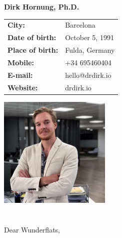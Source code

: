 \documentclass[11pt]{article}
\begin{document}
\Large
\noindent
\textbf{Dirk Hornung, Ph.D.} \\

\normalsize
\noindent
\begin{minipage}{0.5\linewidth}
  \begin{tabularx}{0.6\textwidth}{>{\bfseries}l l}
    City:           & Barcelona \\
    Date of birth:  & October 5, 1991\\
    Place of birth: & Fulda, Germany \\
    Mobile:         & +34 695460404 \\
    E-mail:         & hello@drdirk.io \\
    Website:      	& drdirk.io
  \end{tabularx}
\end{minipage}
\begin{minipage}{0.5\linewidth}
  \begin{flushright}
    \includegraphics[width=0.4\textwidth]{dirk.png}
  \end{flushright}
\end{minipage}
	
 \section*{}
 \vspace{1cm}
 Dear Wunderflats, \\
\end{document}
